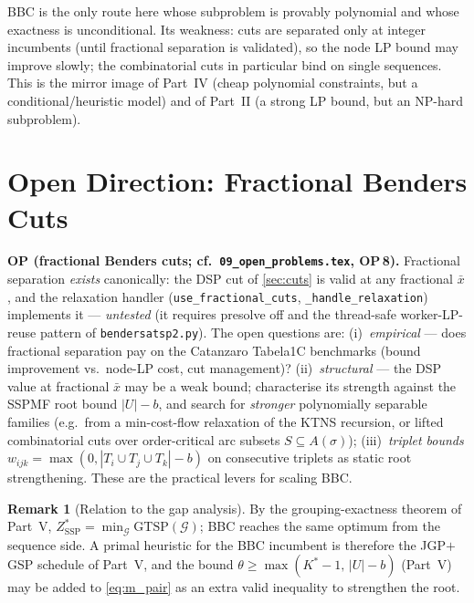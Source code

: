 \documentclass[11pt,a4paper]{article}
\theoremstyle{plain}
\theoremstyle{definition}
\newtheorem{remark}[theorem]{Remark}
\newcommand{\ZSSP}{Z_{\mathrm{SSP}}^{*}}
\newcommand{\Kstar}{K^{*}}
\begin{document}
BBC is the only route here whose subproblem is provably polynomial and whose exactness is
unconditional. Its weakness: cuts are separated only at integer incumbents (until
fractional separation is validated), so the node LP bound may improve slowly; the
combinatorial cuts in particular bind on single sequences. This is the mirror image of Part~IV (cheap polynomial
constraints, but a conditional/heuristic model) and of Part~II (a strong LP bound, but an
NP-hard subproblem).

\section{Open Direction: Fractional Benders Cuts}
\label{sec:open}

\begin{openproblem}
\textbf{OP (fractional Benders cuts; cf.\ \texttt{09\_open\_problems.tex}, OP\,8).}
Fractional separation \emph{exists} canonically: the DSP cut of \cref{sec:cuts} is valid
at any fractional $\bar x$, and the relaxation handler
(\texttt{use\_fractional\_cuts}, \texttt{\_handle\_relaxation}) implements it ---
\emph{untested} (it requires presolve off and the thread-safe worker-LP-reuse pattern of
\texttt{bendersatsp2.py}). The open questions are: (i)~\emph{empirical} --- does
fractional separation pay on the Catanzaro Tabela1C benchmarks (bound improvement vs.\
node-LP cost, cut management)? (ii)~\emph{structural} --- the DSP value at fractional
$\bar x$ may be a weak bound; characterise its strength against the SSPMF root bound
$|U|-b$, and search for \emph{stronger} polynomially separable families (e.g.\ from a
min-cost-flow relaxation of the KTNS recursion, or lifted combinatorial cuts over
order-critical arc subsets $S\subseteq A(\sigma)$); (iii)~\emph{triplet bounds}
$w_{ijk}=\max(0,|T_i\cup T_j\cup T_k|-b)$ on consecutive triplets as static root
strengthening. These are the practical levers for scaling BBC.
\end{openproblem}

\begin{remark}[Relation to the gap analysis]
By the grouping-exactness theorem of Part~V, $\ZSSP=\min_{\mathcal{G}}\mathrm{GTSP}(\mathcal{G})$;
BBC reaches the same optimum from the sequence side. A primal heuristic for the BBC incumbent
is therefore the JGP$+$GSP schedule of Part~V, and the bound
$\theta\ge\max(\Kstar-1,\,|U|-b)$ (Part~V) may be added to \eqref{eq:m_pair} as an extra valid
inequality to strengthen the root.
\end{remark}
\end{document}
